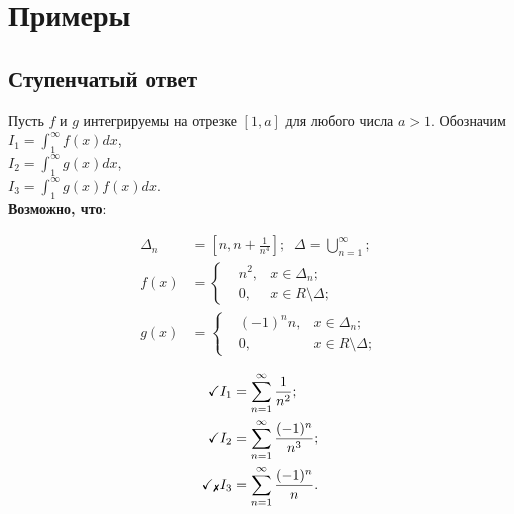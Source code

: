 \section*{Примеры}

\subsection*{Ступенчатый ответ}
\begin{minipage}[]{0.3\textwidth}
Пусть $f$ и $g$ интегрируемы на отрезке $[1, a]$
для любого числа $a > 1$. Обозначим \\
\phantom{42} \hspace{1cm} $I_1 = \int_1^{\infty} f(x) dx$, \\
\phantom{42} \hspace{1cm} $I_2 = \int_1^{\infty} g(x) dx$, \\
\phantom{42} \hspace{1cm} $I_3 = \int_1^{\infty} g(x) f(x) dx$. \\
\textbf{Возможно, что}:
\end{minipage}
\hfill
\begin{minipage}[]{0.3\textwidth}
\begin{equation*}
\begin{split}
\Delta_n &= \left[n, n + \frac{1}{n^4} \right]; \; \; \Delta = \bigcup_{n=1}^{\infty} ; \\
f(x) &= \left\{
    \begin{aligned}
        &n^2, &x \in \Delta_n; \\
        &0, &x \in R \setminus \Delta;
    \end{aligned}
    \right. \\
g(x) &= \left\{
    \begin{aligned}
        &(-1)^n n, &x \in \Delta_n ;\\
        &0, &x \in R \setminus \Delta;
    \end{aligned}
    \right.
\end{split}
\end{equation*}
\end{minipage}
\hfill
\begin{minipage}[]{0.2\textwidth}
\begin{equation*}
\begin{split}
\checkmark I_1 &= \sum_{n=1}^{\infty} \frac{1}{n^2}; \\
\checkmark I_2 &= \sum_{n=1}^{\infty} \frac{(-1)^n}{n^3}; \\
\checkmark_{\text{\xmark}} I_3 &= \sum_{n=1}^{\infty} \frac{(-1)^n}{n}.
\end{split}
\end{equation*}
\end{minipage}


